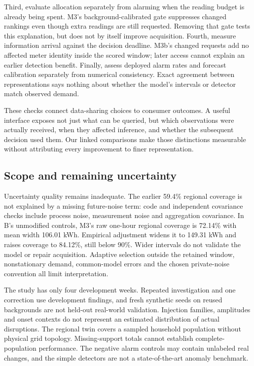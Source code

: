 \documentclass[conference]{IEEEtran}
\begin{document}
Third, evaluate allocation separately from alarming when the reading budget is already being spent. M3's background-calibrated gate suppresses changed rankings even though extra readings are still requested. Removing that gate tests this explanation, but does not by itself improve acquisition. Fourth, measure information arrival against the decision deadline. M3b's changed requests add no affected meter identity inside the scored window; later access cannot explain an earlier detection benefit. Finally, assess deployed alarm rates and forecast calibration separately from numerical consistency. Exact agreement between representations says nothing about whether the model's intervals or detector match observed demand.

These checks connect data-sharing choices to consumer outcomes. A useful interface exposes not just what can be queried, but which observations were actually received, when they affected inference, and whether the subsequent decision used them. Our linked comparisons make those distinctions measurable without attributing every improvement to finer representation.

\balance
\subsection{Scope and remaining uncertainty}
Uncertainty quality remains inadequate. The earlier 59.4\% regional coverage is not explained by a missing future-noise term: code and independent covariance checks include process noise, measurement noise and aggregation covariance. In B's unmodified controls, M3's raw one-hour regional coverage is 72.14\% with mean width 106.01 kWh. Empirical adjustment widens it to 149.31 kWh and raises coverage to 84.12\%, still below 90\%. Wider intervals do not validate the model or repair acquisition. Adaptive selection outside the retained window, nonstationary demand, common-model errors and the chosen private-noise convention all limit interpretation.

The study has only four development weeks. Repeated investigation and one correction use development findings, and fresh synthetic seeds on reused backgrounds are not held-out real-world validation. Injection families, amplitudes and onset contexts do not represent an estimated distribution of actual disruptions. The regional twin covers a sampled household population without physical grid topology. Missing-support totals cannot establish complete-population performance. The negative alarm controls may contain unlabeled real changes, and the simple detectors are not a state-of-the-art anomaly benchmark.
\end{document}
